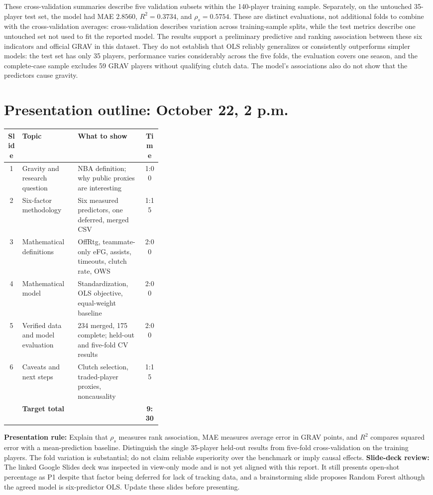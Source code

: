 \documentclass[11pt]{article}
\begin{document}
These cross-validation summaries describe five validation subsets within
the 140-player training sample. Separately, on the untouched 35-player
test set, the model had MAE $2.8560$, $R^2=0.3734$, and
$\rho_s=0.5754$. These are distinct evaluations, not additional folds
to combine with the cross-validation averages: cross-validation describes
variation across training-sample splits, while the test metrics describe
one untouched set not used to fit the reported model. The results support
a preliminary predictive and ranking association between these six
indicators and official GRAV in this dataset. They do not establish that
OLS reliably generalizes or consistently outperforms simpler models:
the test set has only 35 players, performance varies considerably across
the five folds, the evaluation covers one season, and the complete-case
sample excludes 59 GRAV players without qualifying clutch data. The
model's associations also do not show that the predictors cause gravity.

\section{Presentation outline: October 22, 2 p.m.}
\begin{center}
\small
\begin{tabularx}{\linewidth}{@{}cp{0.36\linewidth}Xc@{}}
\toprule
\textbf{Slide} & \textbf{Topic} & \textbf{What to show} & \textbf{Time}\\
\midrule
1 & Gravity and research question & NBA definition; why public proxies are interesting & 1:00\\
2 & Six-factor methodology & Six measured predictors, one deferred, merged CSV & 1:15\\
3 & Mathematical definitions & OffRtg, teammate-only eFG, assists, timeouts, clutch rate, OWS & 2:00\\
4 & Mathematical model & Standardization, OLS objective, equal-weight baseline & 2:00\\
5 & Verified data and model evaluation & 234 merged, 175 complete; held-out and five-fold CV results & 2:00\\
6 & Caveats and next steps & Clutch selection, traded-player proxies, noncausality & 1:15\\
\midrule
 & \textbf{Target total} & & \textbf{9:30}\\
\bottomrule
\end{tabularx}
\end{center}
\textbf{Presentation rule:} Explain that $\rho_s$ measures rank
association, MAE measures average error in GRAV points, and $R^2$
compares squared error with a mean-prediction baseline. Distinguish the
single 35-player held-out results from five-fold cross-validation on the
training players. The fold variation is substantial; do not claim
reliable superiority over the benchmark or imply causal effects.
\textbf{Slide-deck review:} The linked Google Slides deck was inspected in
view-only mode and is not yet aligned with this report. It still presents
open-shot percentage as P1 despite that factor being deferred for lack of
tracking data, and a brainstorming slide proposes Random Forest although
the agreed model is six-predictor OLS. Update these slides before presenting.
\end{document}
